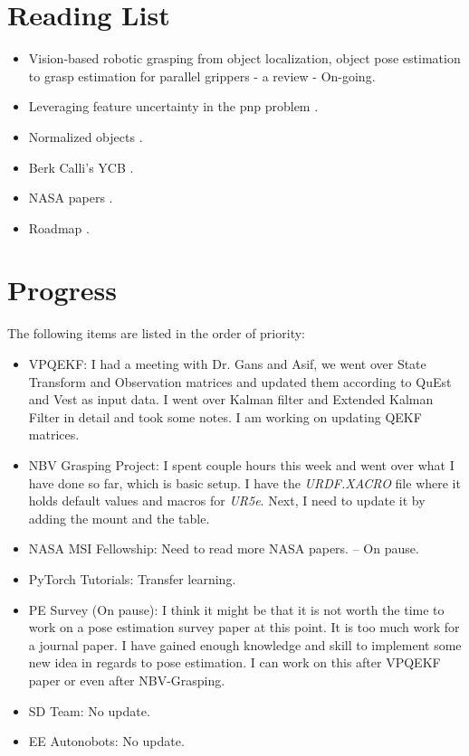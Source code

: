 \documentclass[11pt]{article}
\begin{document}
\section{Reading List}
\begin{itemize}
      \item Vision-based robotic grasping from object localization, object pose estimation to grasp estimation for parallel grippers - a review \cite{du2020vision} - On-going.
      \item Leveraging feature uncertainty in the pnp problem \cite{ferraz2014leveraging}.
      \item Normalized objects \cite{Wang_2019_CVPR}.
      \item Berk Calli's YCB \cite{calli2015ycb}.
      \item NASA papers \cite{NASATech44:online}.
      \item Roadmap \cite{roadmap251:online}.
\end{itemize}

\section{Progress}
The following items are listed in the order of priority:
\begin{itemize}
      \item VPQEKF: I had a meeting with Dr. Gans and Asif, we went over State Transform and Observation matrices and updated them according to QuEst and Vest as input data. I went over Kalman filter and Extended Kalman Filter in detail and took some notes. I am working on updating QEKF matrices.

      \item NBV Grasping Project: I spent couple hours this week and went over what I have done so far, which is basic setup. I have the \textit{URDF.XACRO} file where it holds default values and macros for \textit{UR5e}. Next, I need to update it by adding the mount and the table.

      \item NASA MSI Fellowship: Need to read more NASA papers. -- On pause.
      \item PyTorch Tutorials: Transfer learning.
      \item PE Survey (On pause): I think it might be that it is not worth the time to work on a pose estimation survey paper at this point. It is too much work for a journal paper. I have gained enough knowledge and skill to implement some new idea in regards to pose estimation. I can work on this after VPQEKF paper or even after NBV-Grasping.

      \item SD Team: No update.
      \item EE Autonobots: No update.
\end{itemize}
\end{document}
